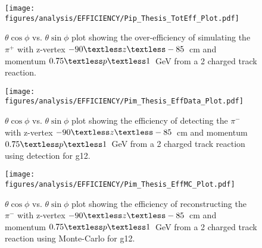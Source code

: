 \begin{figure}[h!]\begin{center}
		\texttt{[image: \\figures/analysis/EFFICIENCY/Pip\_Thesis\_TotEff\_Plot.pdf]}
		\caption[$\theta \cos\phi$ vs. $\theta \sin\phi$ plot showing the over-efficiency of simulating the $\pi^+$ with z-vertex $-90\textless z\textless-85$~cm and momentum $0.75\textless p \textless 1$~GeV from a 2 charged track reaction]{\label{fig:toteff_pip} $\theta \cos\phi$ vs. $\theta \sin\phi$ plot showing the over-efficiency of simulating the $\pi^+$ with z-vertex $-90\textless z\textless-85$~cm and momentum $0.75\textless p \textless 1$~GeV from a 2 charged track reaction.}
\end{center}\end{figure}
\begin{figure}[h!]\begin{center}
		\texttt{[image: \\figures/analysis/EFFICIENCY/Pim\_Thesis\_EffData\_Plot.pdf]}
		\caption[$\theta \cos\phi$ vs. $\theta \sin\phi$ plot showing the efficiency of detecting the $\pi^-$ with z-vertex $-90\textless z\textless-85$~cm and momentum $0.75\textless p \textless 1$~GeV from a 2 charged track reaction using  detection for g12]{\label{fig:eff_pim_data} $\theta \cos\phi$ vs. $\theta \sin\phi$ plot showing the efficiency of detecting the $\pi^-$ with z-vertex $-90\textless z\textless-85$~cm and momentum $0.75\textless p \textless 1$~GeV from a 2 charged track reaction using  detection for g12.}
\end{center}\end{figure}
\begin{figure}[h!]\begin{center}
		\texttt{[image: \\figures/analysis/EFFICIENCY/Pim\_Thesis\_EffMC\_Plot.pdf]}
		\caption[$\theta \cos\phi$ vs. $\theta \sin\phi$ plot showing the efficiency of reconstructing the $\pi^-$ with z-vertex $-90\textless z\textless-85$~cm and momentum $0.75\textless p \textless 1$~GeV from a 2 charged track reaction using  Monte-Carlo for g12]{\label{fig:eff_pim_MC} $\theta \cos\phi$ vs. $\theta \sin\phi$ plot showing the efficiency of reconstructing the $\pi^-$ with z-vertex $-90\textless z\textless-85$~cm and momentum $0.75\textless p \textless 1$~GeV from a 2 charged track reaction using  Monte-Carlo for g12.}
\end{center}\end{figure}
